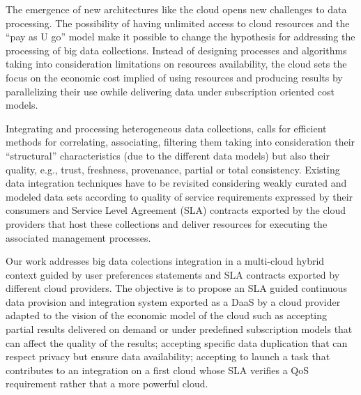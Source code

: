 The emergence of new architectures like the cloud opens new challenges to data processing. 
The possibility of having unlimited access to cloud resources and the ``pay as U go'' model make it possible to change the hypothesis for addressing the processing of big  data collections. 
Instead of designing processes and algorithms taking into consideration  limitations on resources availability, the cloud sets the focus on the economic cost implied of using resources and producing results by parallelizing their use owhile delivering data under subscription oriented cost models.
 
Integrating and processing heterogeneous data collections, calls for efficient methods for correlating, associating, filtering them taking into consideration their ``structural'' characteristics (due to the different data models) but also their quality, e.g., trust, freshness, provenance, partial or total consistency. 
Existing data integration techniques have to be revisited considering weakly curated and modeled data sets according to quality of service requirements expressed by their consumers and Service Level Agreement (SLA) contracts exported by the cloud providers that host  these collections and deliver resources for executing the associated management processes.


Our work addresses big data colections integration  in a multi-cloud hybrid context guided by user preferences statements and SLA contracts exported by different cloud providers. The objective is to propose an SLA guided continuous data provision and integration system exported as a DaaS by a cloud provider adapted to the vision of the economic model of the cloud such as accepting partial results delivered on demand or under predefined subscription models that can affect the quality of the results; accepting specific data duplication that can respect privacy but ensure data availability; accepting to launch a task that contributes to an integration on a first cloud whose SLA verifies a QoS requirement rather that a more powerful cloud.  

